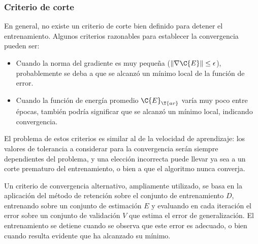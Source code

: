 %
\subsubsection{Criterio de corte}
%
En general, no existe un criterio de corte bien definido para
detener el entrenamiento. Algunos criterios razonables para establecer
la convergencia pueden ser:
%
\begin{itemize}
\item Cuando la norma del gradiente es muy pequeña
  ($\|\nabla\C{E}\|\leq\epsilon$), probablemente se deba a que se
  alcanzó un mínimo local de la función de error.
\item Cuando la función de energía promedio $\C{E}_{\T{av}}$ varía muy
  poco entre épocas, también podría significar que se alcanzó un
  mínimo local, indicando convergencia.
\end{itemize}
%
El problema de estos criterios es similar al de la velocidad de
aprendizaje: los valores de tolerancia a considerar para la
convergencia serán siempre dependientes del problema, y una elección
incorrecta puede llevar ya sea a un corte prematuro del entrenamiento,
o bien a que el algoritmo nunca converja.

Un criterio de convergencia alternativo, ampliamente utilizado, se
basa en la aplicación del método de retención sobre el conjunto de
entrenamiento $D$, entrenando sobre un conjunto de estimación $E$ y
evaluando en cada iteración el error sobre un conjunto de validación
$V$ que estima el error de generalización.  El entrenamiento se
detiene cuando se observa que este error es adecuado, o bien cuando
resulta evidente que ha alcanzado su mínimo.
